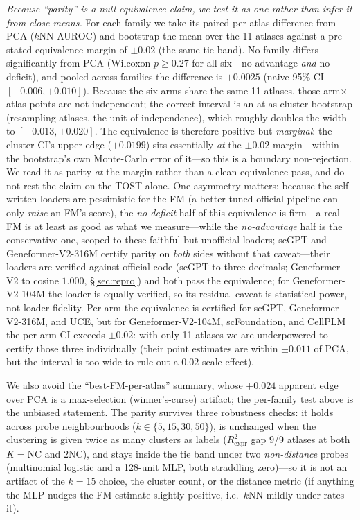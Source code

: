 \documentclass[11pt]{article}
\begin{document}
\emph{Because ``parity'' is a null-equivalence claim, we test it as one rather than infer it from close means.} For each family we take its paired per-atlas difference from PCA ($k$NN-AUROC) and bootstrap the mean over the 11 atlases against a pre-stated equivalence margin of $\pm0.02$ (the same tie band). No family differs significantly from PCA (Wilcoxon $p\ge0.27$ for all six---no advantage \emph{and} no deficit), and pooled across families the difference is $+0.0025$ (naive 95\% CI $[-0.006,+0.010]$). Because the six arms share the same 11 atlases, those arm$\times$atlas points are not independent; the correct interval is an atlas-cluster bootstrap (resampling atlases, the unit of independence), which roughly doubles the width to $[-0.013,+0.020]$. The equivalence is therefore positive but \emph{marginal}: the cluster CI's upper edge ($+0.0199$) sits essentially \emph{at} the $\pm0.02$ margin---within the bootstrap's own Monte-Carlo error of it---so this is a boundary non-rejection. We read it as parity \emph{at} the margin rather than a clean equivalence pass, and do not rest the claim on the TOST alone. One asymmetry matters: because the self-written loaders are pessimistic-for-the-FM (a better-tuned official pipeline can only \emph{raise} an FM's score), the \emph{no-deficit} half of this equivalence is firm---a real FM is at least as good as what we measure---while the \emph{no-advantage} half is the conservative one, scoped to these faithful-but-unofficial loaders; scGPT and Geneformer-V2-316M certify parity on \emph{both} sides without that caveat---their loaders are verified against official code (scGPT to three decimals; Geneformer-V2 to cosine $1.000$, \S\ref{sec:repro}) and both pass the equivalence; for Geneformer-V2-104M the loader is equally verified, so its residual caveat is statistical power, not loader fidelity. Per arm the equivalence is certified for scGPT, Geneformer-V2-316M, and UCE, but for Geneformer-V2-104M, scFoundation, and CellPLM the per-arm CI exceeds $\pm0.02$: with only 11 atlases we are underpowered to certify those three individually (their point estimates are within $\pm0.011$ of PCA, but the interval is too wide to rule out a $0.02$-scale effect).

We also avoid the ``best-FM-per-atlas'' summary, whose $+0.024$ apparent edge over PCA is a max-selection (winner's-curse) artifact; the per-family test above is the unbiased statement. The parity survives three robustness checks: it holds across probe neighbourhoods ($k\in\{5,15,30,50\}$), is unchanged when the clustering is given twice as many clusters as labels ($R^2_{\mathrm{expr}}$ gap 9/9 atlases at both $K{=}\mathrm{NC}$ and $2\mathrm{NC}$), and stays inside the tie band under two \emph{non-distance} probes (multinomial logistic and a 128-unit MLP, both straddling zero)---so it is not an artifact of the $k{=}15$ choice, the cluster count, or the distance metric (if anything the MLP nudges the FM estimate slightly positive, i.e.\ $k$NN mildly under-rates it).
\end{document}
